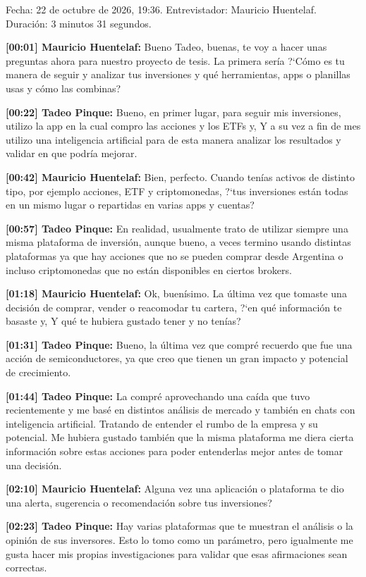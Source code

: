 Fecha: 22 de octubre de 2026, 19:36. Entrevistador: Mauricio Huentelaf. Duración: 3 minutos 31 segundos.
\par\noindent\textbf{[00:01] Mauricio Huentelaf:} Bueno Tadeo, buenas, te voy a hacer unas preguntas ahora para nuestro proyecto de tesis. La primera sería ?`Cómo es tu manera de seguir y analizar tus inversiones y qué herramientas, apps o planillas usas y cómo las combinas?
\par\noindent\textbf{[00:22] Tadeo Pinque:} Bueno, en primer lugar, para seguir mis inversiones, utilizo la app en la cual compro las acciones y los ETFs y, Y a su vez a fin de mes utilizo una inteligencia artificial para de esta manera analizar los resultados y validar en que podría mejorar.
\par\noindent\textbf{[00:42] Mauricio Huentelaf:} Bien, perfecto. Cuando tenías activos de distinto tipo, por ejemplo acciones, ETF y criptomonedas, ?`tus inversiones están todas en un mismo lugar o repartidas en varias apps y cuentas?
\par\noindent\textbf{[00:57] Tadeo Pinque:} En realidad, usualmente trato de utilizar siempre una misma plataforma de inversión, aunque bueno, a veces termino usando distintas plataformas ya que hay acciones que no se pueden comprar desde Argentina o incluso criptomonedas que no están disponibles en ciertos brokers.
\par\noindent\textbf{[01:18] Mauricio Huentelaf:} Ok, buenísimo. La última vez que tomaste una decisión de comprar, vender o reacomodar tu cartera, ?`en qué información te basaste y, Y qué te hubiera gustado tener y no tenías?
\par\noindent\textbf{[01:31] Tadeo Pinque:} Bueno, la última vez que compré recuerdo que fue una acción de semiconductores, ya que creo que tienen un gran impacto y potencial de crecimiento.
\par\noindent\textbf{[01:44] Tadeo Pinque:} La compré aprovechando una caída que tuvo recientemente y me basé en distintos análisis de mercado y también en chats con inteligencia artificial. Tratando de entender el rumbo de la empresa y su potencial. Me hubiera gustado también que la misma plataforma me diera cierta información sobre estas acciones para poder entenderlas mejor antes de tomar una decisión.
\par\noindent\textbf{[02:10] Mauricio Huentelaf:} Alguna vez una aplicación o plataforma te dio una alerta, sugerencia o recomendación sobre tus inversiones?
\par\noindent\textbf{[02:23] Tadeo Pinque:} Hay varias plataformas que te muestran el análisis o la opinión de sus inversores. Esto lo tomo como un parámetro, pero igualmente me gusta hacer mis propias investigaciones para validar que esas afirmaciones sean correctas.
